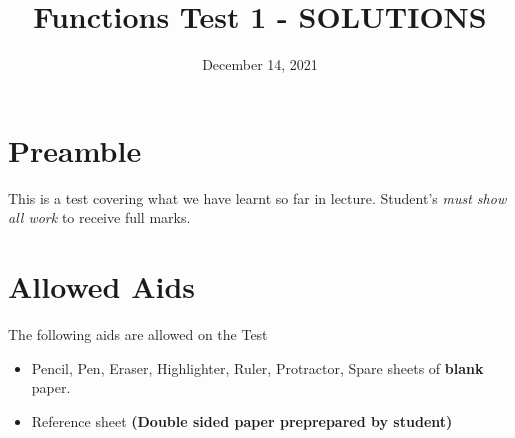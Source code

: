 \documentclass[12pt]{article} %
\title{Functions Test 1 - SOLUTIONS}
\date{December 14, 2021}
\begin{document}
    \renewcommand*{\coursecode}{MCR3U Quiz} %
    \renewcommand*{\assgnnumber}{1} %
    \renewcommand*{\submdate}{November, 2021} %
    \renewcommand*{\studentfname}{\textbf{Name:}} %
    \renewcommand*{\studentlname}{} %

    \renewcommand\qedsymbol{$\blacksquare$}
    \setfigpath
    \fancyhfoffset[L,O]{0pt} %




	\maketitle
	\section{Preamble}
	This is a test covering what we have learnt so far in lecture. Student's \emph{must show all work} to receive full marks.
	\section{Allowed Aids}
	The following aids are allowed on the Test
	\begin{itemize}
		\item Pencil, Pen, Eraser, Highlighter, Ruler, Protractor, Spare sheets of \textbf{blank} paper.
		\item Reference sheet \textbf{(Double sided paper preprepared by student)}
	\end{itemize}
\end{document}

